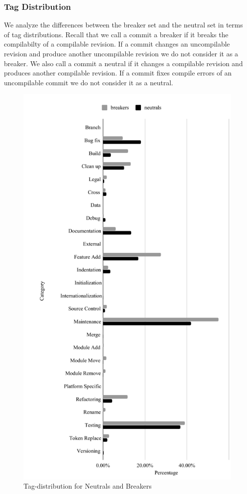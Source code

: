 \subsubsection{Tag Distribution}
We analyze the differences between the breaker set and the neutral set in terms of tag distributions.
Recall that we call a commit a breaker if it breaks the compilabilty of a compilable revision.
If a commit changes an uncompilable revision and produce another uncompilable revision we do not consider it as a breaker.
We also call a commit a neutral if it changes a compilable revision and produces another compilable revision.
If a commit fixes compile errors of an uncompilable commit we do not consider it as a neutral.

\begin{figure}[htbp]
\centerline{\includegraphics[scale=0.5]{figures/breaker_neutral.pdf}}
\caption{Tag-distribution for Neutrals and Breakers}
\label{fig:breaker_neutral_distribution}
\end{figure}

